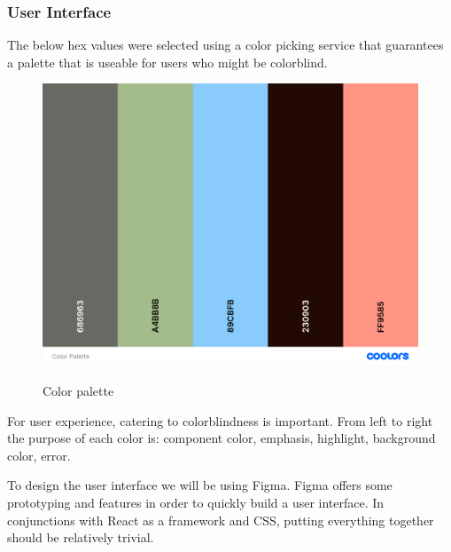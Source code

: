 \subsubsection{User Interface}
The below hex values were selected using a color picking service that guarantees a palette that is useable for users who might be colorblind.
\begin{figure}[H]
    \caption{Color palette}
    \centering
    \includegraphics[width=\textwidth]{images/Color Palette.png}
    \label{fig:color_palette}
\end{figure}
For user experience, catering to colorblindness is important. From left to right the purpose of each color is: component color, emphasis, highlight, background color, error.

To design the user interface we will be using Figma. Figma offers some prototyping and features in order to quickly build a user interface. In conjunctions with React as a framework and CSS, putting everything together should be relatively trivial.